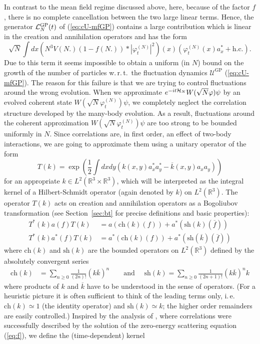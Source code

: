 \documentclass[11pt,a4paper]{article}
\newcommand{\bR}{{\mathbb R}}
\newcommand{\cH}{{\cal H}}
\newcommand{\cL}{{\cal L}}
\begin{document}
In contrast to the mean field regime discussed above, here, because of the factor $f$, there is no complete cancellation between the two large linear terms. Hence, the generator $\cL^{\text{GP}}_N (t)$ of (\ref{eq:cU-mfGP}) contains a large contribution which is linear in the creation and annihilation operators and has the form
\begin{equation}\label{eq:lin-N} \sqrt{N} \int dx \left( N^3 V(N.) (1- f(N.)) * |\varphi^{(N)}_t|^2 \right) (x) \left( \varphi^{(N)}_t (x) a_x^* + \text{h.c.} \right). \end{equation}
Due to this term it seems impossible to obtain a uniform (in $N$) bound on the growth of the number of particles w.\,r.\,t.\ the fluctuation dynamics $\mathcal{U}^{\text{GP}}$ (\ref{eq:cU-mfGP}). The reason for this failure is that we are trying to control fluctuations around the wrong evolution. When we approximate $e^{-it \cH_N} W(\sqrt{N} \varphi) \psi$ by an evolved coherent state $W(\sqrt{N} \varphi^{(N)}_t) \psi$, we completely neglect the correlation structure developed by the many-body evolution. As a result, fluctuations around the coherent approximation $W(\sqrt{N} \varphi^{(N)}_t) \psi$ are too strong to be bounded uniformly in $N$. 
Since correlations are, in first order, an effect of two-body interactions, we are going to approximate them using a unitary operator of the form
\[ T(k) = \exp\left(\frac{1}{2} \int dx dy \left(k(x,y) a_x^* a_y^* - \overline{k} (x,y) a_x a_y \right)\right) \]
for an appropriate $k \in L^2 (\bR^3 \times \bR^3)$, which will be interpreted as the integral kernel of a Hilbert-Schmidt operator (again denoted by $k$) on $L^2 (\bR^3)$. The operator $T(k)$ acts on creation and annihilation operators as a Bogoliubov transformation (see Section~\ref{sec:bt} for precise definitions and basic properties):
\[ \begin{split} T^* (k) a (f) T (k) &= a(\text{ch} (k) (f)) + a^* (\text{sh} (k) (\overline{f})) \\
T^*(k) a^* (f) T (k) &= a^* (\text{ch} (k) (f)) + a^* (\text{sh} (\overline{k}) (\overline{f}))
\end{split} \]
where $\text{ch} (k)$ and $\text{sh} (k)$ are the bounded operators on $L^2 (\bR^3)$ defined by the absolutely convergent series
\[ \begin{split} 
\text{ch} (k) & = \sum_{n\geq 0} \frac{1}{(2n)!} (k\overline{k})^n \qquad \text{and } \quad 
\text{sh} (k)   = \sum_{n \geq 0} \frac{1}{(2n+1)!} (k\overline{k})^n k \end{split} \]
where products of $k$ and $\overline{k}$ have to be understood in the sense of operators. (For a heuristic picture it is often sufficient to think of the leading terms only, i.\,e.\ $\text{ch}(k) \simeq 1$ (the identity operator) and $\text{sh}(k) \simeq k$; the higher order remainders are easily controlled.) Inspired by the analysis of \cite{ESY1,ESY2,ESY3,ESY4}, where correlations were successfully described by the solution of the zero-energy scattering equation (\ref{eq:f}), we define the (time-dependent) kernel 
\end{document}
